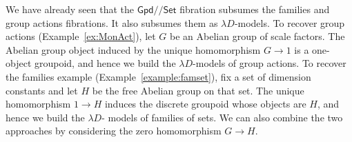 \documentclass[a4paper,UKenglish]{lipics}
\newcommand\note[1]{{ \bf \textcolor{red} {\vspace{2mm}\; \\ Note: #1\\}}}
\newcommand{\ra}{\rightarrow}
\newcommand{\msf}[1]{\mathsf{#1}} %
\newcommand{\Set}{\msf{Set}}
\newcommand{\Cat}{\msf{Cat}}
\newcommand{\Gpd}{\msf{Gpd}}
\newcommand{\Fib}{\msf{Fib}}
\newcommand{\LAb}{\msf{L}_{\msf{Ab}}}
\newcommand{\terminal}{\msf{1}}
\newcommand{\A}{\mathcal{A}}
\newcommand{\D}{\mathcal{D}}
\newcommand{\E}{\mathcal{E}}
\newcommand{\fibre}[2]{#1_{_{#2}}}
\newcommand{\fibreE}[1]{\E_{#1}}
\newcommand{\blank}{\, \underline{\hspace{2mm}} \,}
\newcommand{\SqFun}[1][\blank]{[\, #1 \, ]} %
\newcommand{\Lslice}[1]{#1/\!/\Set}
\newcommand{\GpdSet}{\Lslice{\Gpd}}
\newcommand{\qnt}{\msf{quantity}}
\begin{document}
\begin{example}
We have already seen that the $\GpdSet$ fibration subsumes the families and
group actions fibrations. It also subsumes them as $\lambda D$-models.
To recover group actions (Example~\ref{ex:MonAct}),
let $G$ be an Abelian group of scale factors.
The Abelian group object induced by
the unique homomorphism $G\to 1$ is a one-object groupoid,
and hence we build
the $\lambda D$-models of group actions.
To recover the families example (Example~\ref{example:famset}),
fix a set of dimension constants and let $H$ be the
free Abelian group on that set. The unique homomorphism $1\to H$ induces the
discrete groupoid whose objects are $H$, and hence we build the $\lambda D$-%
models of families of sets.
We can also combine the two approaches
by considering the zero homomorphism $G\to H$.
\end{example}




\end{document}
